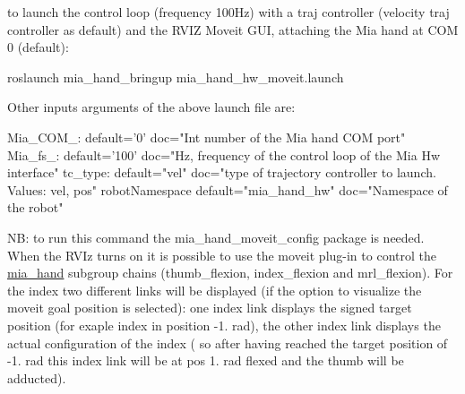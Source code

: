 \begin{DoxyItemize}
\item to launch the control loop (frequency 100Hz) with a traj controller (velocity traj controller as default) and the R\+V\+IZ Moveit G\+UI, attaching the Mia hand at C\+OM 0 (default)\+: \begin{DoxyVerb}roslaunch mia_hand_bringup mia_hand_hw_moveit.launch
\end{DoxyVerb}


Other inputs arguments of the above launch file are\+: \begin{DoxyVerb}Mia_COM_:               default='0'            doc="Int number of the Mia hand COM port"
Mia_fs_:                default='100'          doc="Hz, frequency of the control loop of the Mia Hw interface"
tc_type:                default="vel"          doc="type of trajectory controller to launch. Values: vel, pos"
robotNamespace          default="mia_hand_hw"  doc="Namespace of the robot"
\end{DoxyVerb}


NB\+: to run this command the mia\+\_\+hand\+\_\+moveit\+\_\+config package is needed. When the R\+V\+Iz turns on it is possible to use the moveit plug-\/in to control the \mbox{\hyperlink{namespacemia__hand}{mia\+\_\+hand}} subgroup chains (thumb\+\_\+flexion, index\+\_\+flexion and mrl\+\_\+flexion). For the index two different links will be displayed (if the option to visualize the moveit goal position is selected)\+: one index link displays the signed target position (for exaple index in position -\/1. rad), the other index link displays the actual configuration of the index ( so after having reached the target position of -\/1. rad this index link will be at pos 1. rad flexed and the thumb will be adducted). 
\end{DoxyItemize}